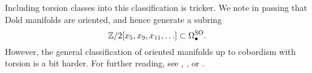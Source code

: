 Including torsion classes into this classification is tricker. We note in passing that Dold manifolds are oriented, and hence generate a subring
\[
	\mathbb{Z}/2[x_5,x_9,x_{11},\ldots] \subset \Omega_\bullet^{\mathrm{SO}}.
\]
However, the general classification of oriented manifolds up to cobordism with torsion is a bit harder. For further reading, see \cite{strong1968cobordism}, \cite{hirzebruch1966methods}, or \cite{may1999concise}.

%


